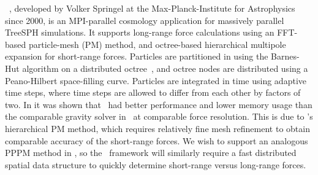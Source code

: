 \documentclass[11pt,letterpaper]{article}
\begin{document}
\SUBSUBSECTION{\gadget}
%
\gadget~\cite{Sp05,wwwgadget}, developed by Volker Springel at
the Max-Planck-Institute for Astrophysics since 2000, is an
MPI-parallel cosmology application for massively parallel TreeSPH
simulations.  It supports long-range force calculations using an
FFT-based particle-mesh (PM) method, and octree-based hierarchical
multipole expansion for short-range forces.
%
Particles are partitioned in  using the Barnes-Hut
algorithm on a distributed octree~\cite{BaHu86}, and octree nodes are
distributed using a Peano-Hilbert space-filling curve.  Particles are
integrated in time using adaptive time steps, where time steps are
allowed to differ from each other by factors of two.
%
In \cite{OsNa05} it
was shown that \gadget\ had better performance and lower memory usage
than the comparable gravity solver in \enzo\ at comparable force
resolution.  This is due to \enzo's hierarchical PM method, which
requires relatively fine mesh refinement to obtain comparable accuracy
of the short-range forces.
%
We wish to support an analogous PPPM method in \enzoii, so the \cello\
framework will similarly require a fast distributed spatial data
structure to quickly determine short-range versus long-range forces.
\end{document}
